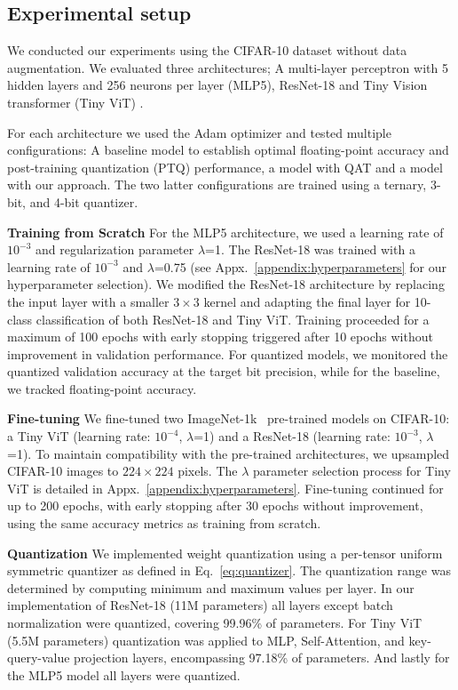\subsection{Experimental setup}
We conducted our experiments using the CIFAR-10 dataset \cite{krizhevsky2009learning} without data augmentation. We evaluated three architectures; A multi-layer perceptron with 5 hidden layers and 256 neurons per layer (MLP5), ResNet-18 \cite{he2016deep} and Tiny Vision transformer (Tiny ViT) \cite{wu2022tinyvit}.

For each architecture we used the Adam optimizer \cite{kingma2014adam} and tested multiple configurations: A baseline model to establish optimal floating-point accuracy and post-training quantization (PTQ) performance, a model with QAT and a model with our approach. The two latter configurations are trained using a ternary, 3-bit, and 4-bit quantizer.

\textbf{Training from Scratch}
For the MLP5 architecture, we used a learning rate of $10^{-3}$ and regularization parameter $\lambda$=1. The ResNet-18 was trained with a learning rate of $10^{-3}$ and $\lambda$=0.75 (see Appx.~\ref{appendix:hyperparameters} for our hyperparameter selection). We modified the ResNet-18 architecture by replacing the input layer with a smaller $3\times3$ kernel and adapting the final layer for 10-class classification of both ResNet-18 and Tiny ViT. Training proceeded for a maximum of 100 epochs with early stopping triggered after 10 epochs without improvement in validation performance. For quantized models, we monitored the quantized validation accuracy at the target bit precision, while for the baseline, we tracked floating-point accuracy.





\textbf{Fine-tuning}
We fine-tuned two ImageNet-1k~\cite{deng2009imagenet} pre-trained models on CIFAR-10: a Tiny ViT (learning rate: $10^{-4}$, $\lambda$=1) and a ResNet-18 (learning rate: $10^{-3}$, $\lambda$=1). 
To maintain compatibility with the pre-trained architectures, we upsampled CIFAR-10 images to $224 \times 224$ pixels. The $\lambda$ parameter selection process for Tiny ViT is detailed in Appx.~\ref{appendix:hyperparameters}. Fine-tuning continued for up to 200 epochs, with early stopping after 30 epochs without improvement, using the same accuracy metrics as training from scratch.

\textbf{Quantization}
We implemented weight quantization using a per-tensor uniform symmetric quantizer as defined in Eq.~\ref{eq:quantizer}. The quantization range was determined by computing minimum and maximum values per layer. In our implementation of ResNet-18 (11M parameters) all layers except batch normalization were quantized, covering 99.96\% of parameters. For Tiny ViT (5.5M parameters) quantization was applied to MLP, Self-Attention, and key-query-value projection layers, encompassing 97.18\% of parameters. And lastly for the MLP5 model all layers were quantized.


